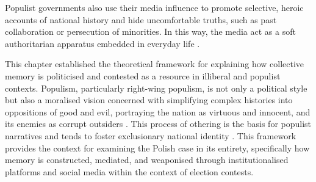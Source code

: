Populist governments also use their media influence to promote selective, heroic accounts of national history and hide uncomfortable truths, such as past collaboration or persecution of minorities. In this way, the media act as a soft authoritarian apparatus embedded in everyday life \citep{bernhard_notitle_2014}.

This chapter established the theoretical framework for explaining how collective memory is politicised and contested as a resource in illiberal and populist contexts. Populism, particularly right-wing populism, is not only a political style but also a moralised vision concerned with simplifying complex histories into oppositions of good and evil, portraying the nation as virtuous and innocent, and its enemies as corrupt outsiders \citep{mazzini_three-dimensional_2018}. \pagebreak This process of othering is the basis for populist narratives and tends to foster exclusionary national identity \citep{bieber_is_2018}. This framework provides the context for examining the Polish case in its entirety, specifically how memory is constructed, mediated, and weaponised through institutionalised platforms and social media within the context of election contests.
